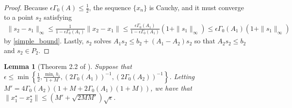 \documentclass{article}
\newtheorem{lemma}[theorem]{Lemma}
\theoremstyle{case}
\numberwithin{theorem}{subsection}
\newcommand{\huff}{{\Gamma_0}}
\begin{document}
\begin{proof}
Because $\epsilon \huff(A)\le\frac 1 2$, the sequence $\{x_n\}$ is Cauchy, and it must converge to a point $s_2$ satisfying
\begin{align*}
\|s_2 - s_1\|_\infty \le \frac{1}{1 - \epsilon\huff(A_1)}\|x_2 - x_1\| \le \frac{\epsilon\huff(A_1)}{1 - \epsilon\huff(A_1)}\left(1 + \|s_1\|_{\infty}\right) \le \epsilon\huff(A_1)\left(1 + \|s_1\|_{\infty}\right)
\end{align*}
by \cref{simple_bound}.
Lastly, $s_2$ solves $A_1s_2 \le b_2 + (A_1 - A_2)s_2$ so that $A_2s_2 \le b_2$ and $s_2 \in P_2$.
\end{proof}



\begin{lemma}[Theorem 2.2 of \cite{dummy:continuity}]
\label{2_2}
Suppose that $\epsilon\le \min\left\{\frac 1 2, \frac{\min_i h_i}{1 + M},\left(2\huff(A_1)\right)^{-1}, \left(2\huff(A_2)\right)^{-1}\right\}$.
Letting $M' = 4\huff(A_2)\left(1 + M + 2\huff(A_1)\left(1 + M\right)\right)$, we have that $\|x_1^{\star} - x_2^{\star}\| \le \left( M' + \sqrt{2MM'}\right)\sqrt{\epsilon}$.
\end{lemma}
\end{document}
